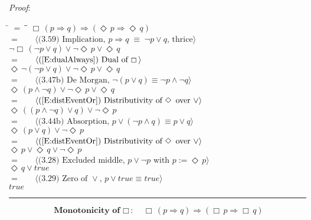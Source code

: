 \documentclass[12pt, fleqn, leqno]{article}
\newcommand{\lgap}{2pt}                             %
\newcommand{\mymathindent}{24pt}                    %
\newcommand{\equivs}{\ensuremath{\;\equiv\;}}       %
\newcommand{\impl}{\ensuremath{\Rightarrow}}        %
\newcommand{\Event}{\Diamond\,}
\newcommand{\Always}{\Box\,}
\newcommand{\myqed}{\rule[-.23ex]{1.2ex}{2.0ex}}
\newcommand{\myqedtab}{\hspace{384pt}}              %
\newcommand{\Gll} {\langle}                         %
\newcommand{\Ggg} {\rangle}                         %
\newcommand{\Hint}[1]     {\ \ \ $\Gll              \mbox{#1} \Ggg$ }   %
\begin{document}
\emph{Proof}:
\begin{tabbing}
\hspace{\mymathindent} \= $= \;$ \= \myqedtab \= \kill
  \> \>   $\Always (p \impl q) \impl (\Event p \impl \Event q)$\\[\lgap]
  \> $=$  \>  \Hint{(3.59) Implication, $p\impl q \equivs \neg p \lor q$, thrice}\\[\lgap]
  \> \>   $\neg\Always (\neg p \lor q) \lor \neg\Event p \lor \Event q$\\[\lgap]
  \> $=$  \>  \Hint{(\ref{E:dualAlways}) Dual of $\Always$}\\[\lgap]
  \> \>   $\Event\neg (\neg p \lor q) \lor \neg\Event p \lor \Event q$\\[\lgap]  
  \> $=$  \>  \Hint{(3.47b) De Morgan, $\neg (p \lor q) \equiv \neg p \land \neg q$}\\[\lgap]
  \> \>   $\Event(p \land \neg q) \lor \neg\Event p \lor \Event q$\\[\lgap]
  \> $=$  \>  \Hint{(\ref{E:distEventOr}) Distributivity of $\Event$ over $\lor$}\\[\lgap]
  \> \>   $\Event((p \land \neg q) \lor q) \lor \neg\Event p$\\[\lgap]
  \> $=$  \>  \Hint{(3.44b) Absorption, $p \lor (\neg p \land q) \equiv p \lor q$}\\[\lgap]
  \> \>   $\Event(p \lor q) \lor \neg\Event p$\\[\lgap]
  \> $=$  \>  \Hint{(\ref{E:distEventOr}) Distributivity of $\Event$ over $\lor$}\\[\lgap]
  \> \>   $\Event p \lor \Event q \lor \neg\Event p$\\[\lgap]
  \> $=$  \>  \Hint{(3.28) Excluded middle, $p\lor\neg p$ with $p := \Event p$}\\[\lgap]
  \> \>   $\Event q \lor true$\\[\lgap]
  \> $=$  \>  \Hint{(3.29) Zero of $\lor$, $p\lor true\equiv true$}\\[\lgap]
  \> \>   $true$ \quad \myqed
\end{tabbing}
\begin{equation}\label{E:distAlwaysImp}
\textbf{Monotonicity of $\Always$:}\quad \Always (p \impl q) \impl (\Always p \impl \Always q)
\end{equation}
\end{document}
